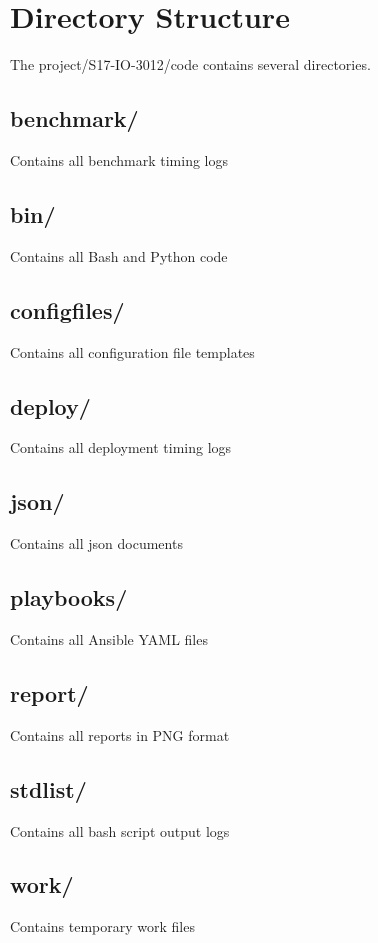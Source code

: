 \documentclass[9pt,twocolumn,twoside]{../../styles/osajnl}
\begin{document}
\section{Directory Structure}

The project/S17-IO-3012/code contains several directories.   

\subsection{benchmark/} Contains all benchmark timing logs  
\subsection{bin/} Contains all Bash and Python code
\subsection{configfiles/} Contains all configuration file templates
\subsection{deploy/} Contains all deployment timing logs
\subsection{json/} Contains all json documents
\subsection{playbooks/} Contains all Ansible YAML files 
\subsection{report/} Contains all reports in PNG format
\subsection{stdlist/} Contains all bash script output logs
\subsection{work/} Contains temporary work files
\end{document}
